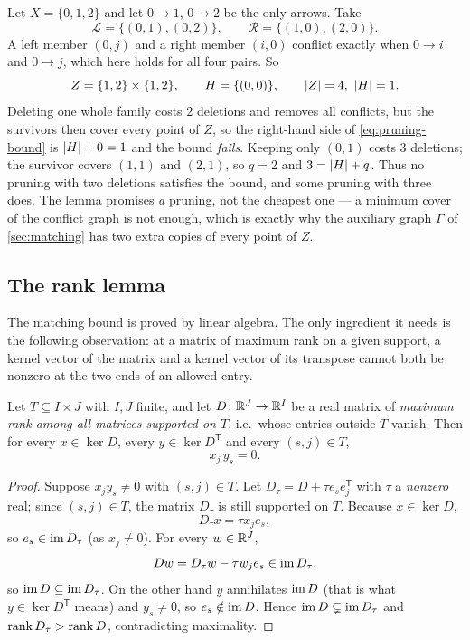 \begin{example}\label{ex:k22}
Let $X=\{0,1,2\}$ and let $0\to1$, $0\to2$ be the only arrows. Take
\[
 \mathcal L=\{(0,1),(0,2)\},\qquad \mathcal R=\{(1,0),(2,0)\}.
\]
A left member $(0,j)$ and a right member $(i,0)$ conflict exactly when $0\to i$ and $0\to j$, which
here holds for all four pairs. So
\[
 Z=\{1,2\}\times\{1,2\},\qquad H=\{(0,0)\},\qquad \lvert Z\rvert=4,\ \lvert H\rvert=1 .
\]
Deleting one whole family costs $2$ deletions and removes all conflicts, but the survivors then
cover every point of $Z$, so the right-hand side of \eqref{eq:pruning-bound} is $\lvert H\rvert+0=1$ and the
bound \emph{fails}. Keeping only $(0,1)$ costs $3$ deletions; the survivor covers $(1,1)$ and
$(2,1)$, so $q=2$ and $3=\lvert H\rvert+q$. Thus no pruning with two deletions satisfies the bound, and
some pruning with three does. The lemma promises \emph{a} pruning, not the cheapest one --- a
minimum cover of the conflict graph is not enough, which is exactly why the auxiliary graph
$\Gamma$ of \cref{sec:matching} has two extra copies of every point of $Z$.
\end{example}

\subsection{The rank lemma}\label{sec:kernel}

The matching bound is proved by linear algebra. The only ingredient it needs is the following
observation: at a matrix of maximum rank on a given support, a kernel vector of the matrix and a
kernel vector of its transpose cannot both be nonzero at the two ends of an allowed entry.

\begin{lemma}\label{lem:kernel}
Let $T\subseteq I\times J$ with $I,J$ finite, and let $D\colon\mathbb R^J\to\mathbb R^I$ be a real matrix of
\emph{maximum rank among all matrices supported on $T$}, i.e.\ whose entries outside $T$ vanish.
Then for every $x\in\ker D$, every $y\in\ker D^{\mathsf T}$ and every $(s,j)\in T$,
\[
 x_j\,y_s=0 .
\]
\end{lemma}


\begin{proof}
Suppose $x_jy_s\ne0$ with $(s,j)\in T$. Let $D_\tau=D+\tau e_se_j^{\mathsf T}$ with $\tau$ a
\emph{nonzero} real; since $(s,j)\in T$, the matrix $D_\tau$ is still supported on $T$. Because
$x\in\ker D$,
\[
 D_\tau x=\tau x_j e_s ,
\]
so $e_s\in\operatorname{im} D_\tau$ (as $x_j\ne0$). For every $w\in\mathbb R^J$,
\[
 Dw=D_\tau w-\tau w_j e_s\in\operatorname{im} D_\tau ,
\]
so $\operatorname{im} D\subseteq\operatorname{im} D_\tau$. On the other hand $y$ annihilates $\operatorname{im} D$ (that is what
$y\in\ker D^{\mathsf T}$ means) and $y_s\ne0$, so $e_s\notin\operatorname{im} D$. Hence
$\operatorname{im} D\subsetneq\operatorname{im} D_\tau$ and $\operatorname{rank} D_\tau>\operatorname{rank} D$, contradicting maximality.
\end{proof}

